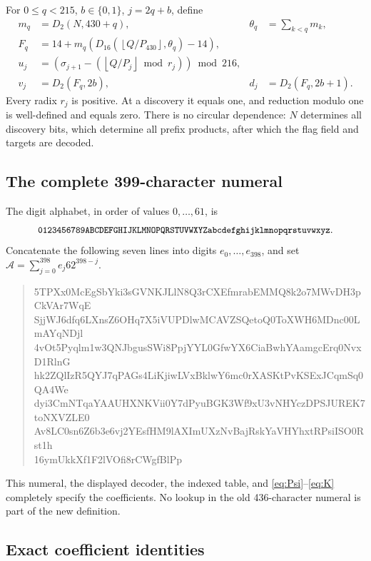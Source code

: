 \documentclass[11pt,letterpaper]{article}
\theoremstyle{definition}
\newcommand{\fl}[1]{\left\lfloor#1\right\rfloor}
\begin{document}
For \(0\le q<215\), \(b\in\{0,1\}\), \(j=2q+b\), define
\begin{align}
 m_q&=D_2(N,430+q),&
 \theta_q&=\sum_{k<q}m_k,\label{eq:mask}\\
 F_q&=14+m_q\left(D_{16}\!\left(\fl{Q/P_{430}},\theta_q\right)-14\right),
   \label{eq:flags}\\
 u_j&=\left(\sigma_{j+1}
        -\left(\fl{Q/P_j}\bmod r_j\right)\right)\bmod216,\label{eq:target}\\
 v_j&=D_2(F_q,2b),&
 d_j&=D_2(F_q,2b+1).\label{eq:write}
\end{align}
Every radix \(r_j\) is positive. At a discovery it equals one, and
reduction modulo one is well-defined and equals zero. There is no
circular dependence: \(N\) determines all discovery bits, which
determine all prefix products, after which the flag field and targets
are decoded.

\subsection{The complete 399-character numeral}

The digit alphabet, in order of values \(0,\ldots,61\), is
\[
 \texttt{\small 0123456789ABCDEFGHIJKLMNOPQRSTUVWXYZabcdefghijklmnopqrstuvwxyz}.
\]
Concatenate the following seven lines into digits
\(e_0,\ldots,e_{398}\), and set
\(\mathcal A=\sum_{j=0}^{398}e_j62^{398-j}\).
\begin{quote}
\ttfamily\small
5TPXx0McEgSbYki3sGVNKJLlN8Q3rCXEfmrabEMMQ8k2o7MWvDH3pCkVAr7WqE\\
SjjWJ6dfq6LXnsZ6OHq7X5iVUPDlwMCAVZSQetoQ0ToXWH6MDnc00LmAYqNDjl\\
4vOt5Pyqlm1w3QNJbgusSWi8PpjYYL0GfwYX6CiaBwhYAamgcErq0NvxD1RlnG\\
hk2ZQlIzR5QYJ7qPAGs4LiKjiwLVxBklwY6mc0rXASKtPvKSExJCqmSq0QA4We\\
dyi3CmNTqaYAAUHXNKVii0Y7dPyuBGK3Wf9xU3vNHYczDPSJUREK7toNXVZLE0\\
Av8LC0sn6Z6b3e6vj2YEsfHM9lAXImUXzNvBajRskYaVHYhxtRPsiISO0Rst1h\\
16ymUkkXf1F2lVOfi8rCWgfBlPp
\end{quote}
This numeral, the displayed decoder, the indexed table, and
\eqref{eq:Psi}--\eqref{eq:K} completely specify the coefficients.
No lookup in the old 436-character numeral is part of the new
definition.

\subsection{Exact coefficient identities}
\end{document}
